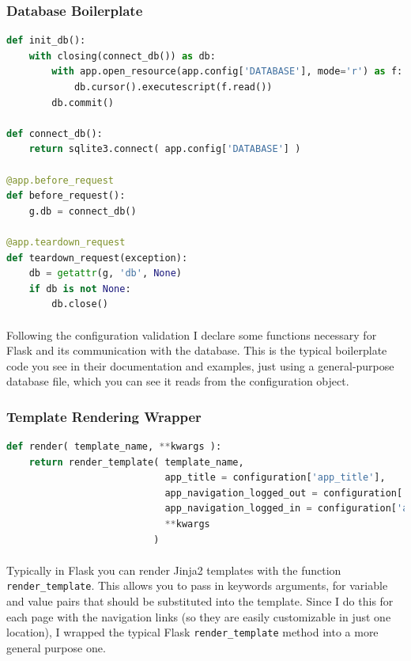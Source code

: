 \documentclass[11pt]{article}
\begin{document}
	\hrulefill
	
	\newpage


	\subsubsection{Database Boilerplate}

\begin{lstlisting}[language=Python]
def init_db():
	with closing(connect_db()) as db:
	    with app.open_resource(app.config['DATABASE'], mode='r') as f:
	        db.cursor().executescript(f.read())
	    db.commit()

def connect_db():
	return sqlite3.connect( app.config['DATABASE'] )

@app.before_request
def before_request():
    g.db = connect_db()

@app.teardown_request
def teardown_request(exception):
    db = getattr(g, 'db', None)
    if db is not None:
		db.close()
\end{lstlisting}


	\paragraph{} Following the configuration validation I declare some functions necessary for Flask and its communication with the database. This is the typical boilerplate code you see in their documentation and examples, just using a general-purpose database file, which you can see it reads from the configuration object.


	\subsubsection{Template Rendering Wrapper}

\begin{lstlisting}[language=Python]
def render( template_name, **kwargs ):
	return render_template( template_name, 
							app_title = configuration['app_title'], 
							app_navigation_logged_out = configuration['app_navigation_logged_out'],
							app_navigation_logged_in = configuration['app_navigation_logged_in'],
							**kwargs
						  )
\end{lstlisting}


	\paragraph{} Typically in Flask you can render Jinja2 templates with the function \texttt{render\_template}. This allows you to pass in keywords arguments, for variable and value pairs that should be substituted into the template. Since I do this for each page with the navigation links (so they are easily customizable in just one location), I wrapped the typical Flask \texttt{render\_template} method into a more general purpose one. 
\end{document}

